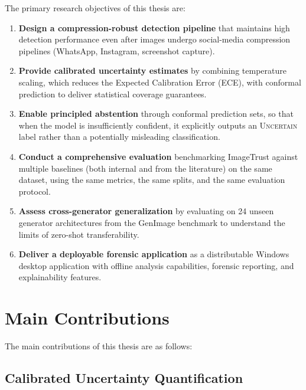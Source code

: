\documentclass[12pt,a4paper]{book}
\theoremstyle{definition}
\theoremstyle{remark}
\begin{document}
The primary research objectives of this thesis are:

\begin{enumerate}
    \item \textbf{Design a compression-robust detection pipeline} that maintains high detection performance even after images undergo social-media compression pipelines (WhatsApp, Instagram, screenshot capture).

    \item \textbf{Provide calibrated uncertainty estimates} by combining temperature scaling, which reduces the Expected Calibration Error (ECE), with conformal prediction \cite{vovk2005algorithmic} to deliver statistical coverage guarantees.

    \item \textbf{Enable principled abstention} through conformal prediction sets, so that when the model is insufficiently confident, it explicitly outputs an \textsc{Uncertain} label rather than a potentially misleading classification.

    \item \textbf{Conduct a comprehensive evaluation} benchmarking ImageTrust against multiple baselines (both internal and from the literature) on the same dataset, using the same metrics, the same splits, and the same evaluation protocol.

    \item \textbf{Assess cross-generator generalization} by evaluating on 24 unseen generator architectures from the GenImage benchmark \cite{zhu2024genimage} to understand the limits of zero-shot transferability.

    \item \textbf{Deliver a deployable forensic application} as a distributable Windows desktop application with offline analysis capabilities, forensic reporting, and explainability features.
\end{enumerate}


\section{Main Contributions}\label{sec:contributions}

The main contributions of this thesis are as follows:

\subsection{Calibrated Uncertainty Quantification}\label{sec:contrib-calibration}
\end{document}
